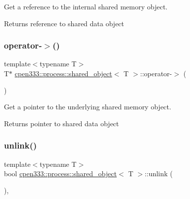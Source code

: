 Get a reference to the internal shared memory object. 

\begin{DoxyReturn}{Returns}
reference to shared data object 
\end{DoxyReturn}
\mbox{\label{classcpen333_1_1process_1_1shared__object_ad5a71ce94a79904c4ef85c5a5d1f44f9}} 
\subsubsection{\texorpdfstring{operator-\/$>$()}{operator->()}}
{\footnotesize\ttfamily template$<$typename T$>$ \\
T$\ast$ \hyperlink{classcpen333_1_1process_1_1shared__object}{cpen333\+::process\+::shared\+\_\+object}$<$ T $>$\+::operator-\/$>$ (\begin{DoxyParamCaption}{ }\end{DoxyParamCaption})\hspace{0.3cm}{\ttfamily [inline]}}



Get a pointer to the underlying shared memory object. 

\begin{DoxyReturn}{Returns}
pointer to shared data object 
\end{DoxyReturn}
\mbox{\label{classcpen333_1_1process_1_1shared__object_aa5b43829da5bd2376927e6285745211c}} 
\subsubsection{\texorpdfstring{unlink()}{unlink()}\hspace{0.1cm}{\footnotesize\ttfamily [1/2]}}
{\footnotesize\ttfamily template$<$typename T$>$ \\
bool \hyperlink{classcpen333_1_1process_1_1shared__object}{cpen333\+::process\+::shared\+\_\+object}$<$ T $>$\+::unlink (\begin{DoxyParamCaption}{ }\end{DoxyParamCaption})\hspace{0.3cm}{\ttfamily [inline]}, {\ttfamily [virtual]}}



